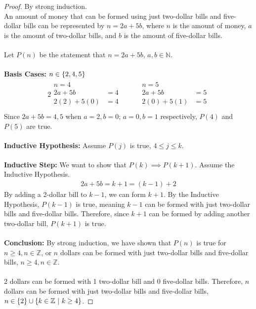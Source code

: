\documentclass[article,12pt]{article}
\DeclarePairedDelimiter\set{\{}{\}}
\newcommand{\unite}{\cup}
\newcommand{\ints}{\mathbb{Z}}
\newcommand{\nats}{\mathbb{N}}
\begin{document}
\begin{proof}
    By strong induction. \\
    An amount of money that can be formed using just two-dollar bills and five-dollar bills can be represented by $n=2a+5b$, where $n$ is the amount of money, $a$ is the amount of two-dollar bills, and $b$ is the amount of five-dollar bills. \\
    \\
    Let $P(n)$ be the statement that $n=2a+5b$, $a, b \in \nats$. \\
    \\
    \textbf{Basis Cases: $n \in \set*{2, 4, 5}$}
    \begin{alignat*}{2}
        \begin{aligned}
            n = 4 \\
            2a + 5b &= 4 \\
            2(2) + 5(0) &= 4 \\
        \end{aligned} \quad &&
        \begin{aligned}
            n = 5 \\
            2a + 5b &= 5 \\
            2(0) + 5(1) &= 5 \\
        \end{aligned}
    \end{alignat*}
    Since $2a+5b=4,5$ when $a=2,b=0$; $a=0,b=1$ respectively, $P(4)$ and $P(5)$ are true. \\
    \\
    \textbf{Inductive Hypothesis:} Assume $P(j)$ is true, $4 \leq j \leq k$. \\
    \\
    \textbf{Inductive Step:} We want to show that $P(k)\implies P(k+1)$. Assume the Inductive Hypothesis.
    \begin{align*}
        2a + 5b = k+1 = (k - 1) + 2 
    \end{align*}   
    By adding a 2-dollar bill to $k-1$, we can form $k+1$. By the Inductive Hypothesis, $P(k-1)$ is true, meaning $k-1$ can be formed with just two-dollar bills and five-dollar bills. Therefore, since $k+1$ can be formed by adding another two-dollar bill, $P(k+1)$ is true. \\
    \\
    \textbf{Conclusion:} By strong induction, we have shown that $P(n)$ is true for $n \geq 4, n \in \ints$, or $n$ dollars can be formed with just two-dollar bills and five-dollar bills, $n \geq 4, n \in \ints$. \\
    \\
    2 dollars can be formed with 1 two-dollar bill and 0 five-dollar bills. Therefore, $n$ dollars can be formed with just two-dollar bills and five-dollar bills, $n \in \set*{2} \unite \set*{k \in \ints \ | \ k \geq 4}$.
\end{proof}
\end{document}
